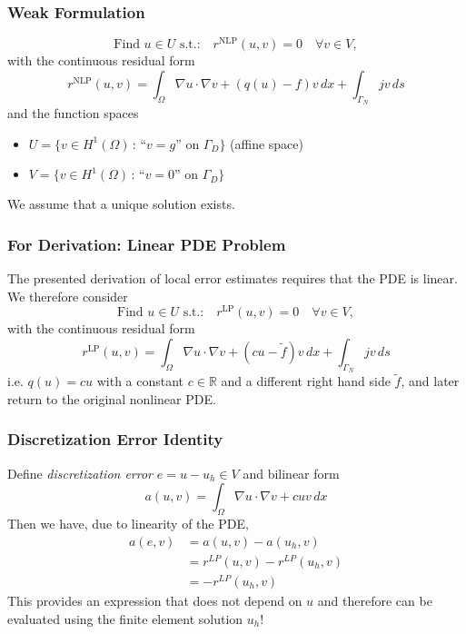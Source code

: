 \documentclass[aspectratio=169,11pt]{beamer}
\theoremstyle{definition}
\begin{document}
\begin{frame}
\frametitle{Weak Formulation}
\begin{equation*}
\text{Find $u\in U$ s.t.:} \quad r^{\text{NLP}}(u,v)=0 \quad \forall v\in V,
\end{equation*}
with the continuous residual form
\begin{equation*}
r^{\text{NLP}}(u,v) = \int_\Omega \nabla u \cdot \nabla v + (q(u)-f)v\,dx + \int_{\Gamma_N} jv\,ds
\end{equation*}
and the function spaces 
\begin{itemize}
\item $U= \{v\in H^1(\Omega) \,:\, \text{``$v=g$'' on $\Gamma_D$}\}$ (affine space)
\item $V= \{v\in H^1(\Omega) \,:\, \text{``$v=0$'' on $\Gamma_D$}\}$
\end{itemize}
We assume that a unique solution exists.
\end{frame}

\begin{frame}
\frametitle{For Derivation: Linear PDE Problem}
The presented derivation of local error estimates requires that the PDE is linear.
We therefore consider
\begin{equation*}
\text{Find $u\in U$ s.t.:} \quad r^{\text{LP}}(u,v)=0 \quad \forall v\in V,
\label{Eq:BasicBuildingBlock}
\end{equation*}
with the continuous residual form
\begin{equation*}
  r^{\text{LP}}(u,v) = \int_\Omega \nabla u \cdot \nabla v + (cu-\tilde{f})v\,dx + \int_{\Gamma_N} jv\,ds
\end{equation*}
i.e. $q(u) = c u$ with a constant $c \in \mathbb{R}$ and a different right hand
side $\tilde{f}$, and later return to the original nonlinear PDE.
\end{frame}

\begin{frame}
\frametitle{Discretization Error Identity}
Define \emph{discretization error} $e = u - u_h \in V$ and bilinear form
\begin{equation*}
  a(u,v) = \int_\Omega \nabla u \cdot \nabla v + c u v \,dx
\end{equation*}
Then we have, due to linearity of the PDE,
\begin{align*}
  a(e,v) &= a(u,v) - a(u_h,v) \\
  &= r^{LP}(u,v) - r^{LP}(u_h,v) \\
  &= - r^{LP}(u_h,v)
\end{align*}
This provides an expression that does not depend on $u$ and therefore can be
evaluated using the finite element solution $u_h$!
\end{frame}
\end{document}

